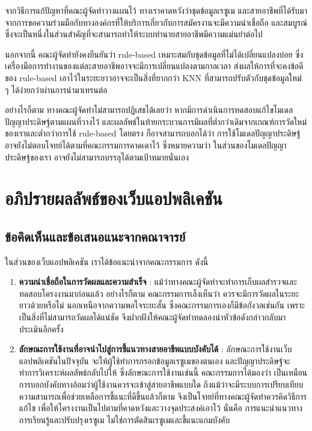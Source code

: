 \par{
    จากวิธีการแก้ปัญหาที่คณะผู้จัดทำวางแผนไว้ ทางเราคาดหวังว่าชุดข้อมูลเรซูเม และสายอาชีพที่ได้รับมาจากการขอความร่วมมือกับทางองค์กรที่ให้บริการเกี่ยวกับการสมัครงานจะมีความน่าเชื่อถือ และสมบูรณ์ ซึ่งจะเป็นหนึ่งในส่วนสำคัญที่จะสามารถทำให้ระบบทำนายสายอาชีพมีความแม่นยำต่อไป
}
\par{
    นอกจากนี้ คณะผู้จัดทำยังคงยืนยันว่า rule-based เหมาะสมกับชุดข้อมูลที่ไม่ได้เปลี่ยนแปลงบ่อย ซึ่งเครื่องมือการทำงานของแต่ละสายอาชีพอาจจะมีการเปลี่ยนแปลงตามกาลเวลา ส่งผลให้การที่จะคงข้อดีของ  rule-based เอาไว้ในระยะยาวอาจจะเป็นสิ่งที่ยากกว่า KNN ที่สามารถปรับตัวกับชุดข้อมูลใหม่ ๆ ได้ง่ายกว่าผ่านการนำมาเทรนต่อ

}
\par{
    อย่างไรก็ตาม ทางคณะผู้จัดทำไม่สามารถปฏิเสธได้เลยว่า หากมีการดำเนินการทดสอบแก้ไขโมเดลปัญญาประดิษฐ์ตามแผนที่วางไว้ และผลลัพธ์ในท้ายกระบวนการมีผลที่ต่ำกว่าเดิมจากเกณฑ์การวัดใหม่ของเราและต่ำกว่าการใช้ rule-based โดยตรง ก็อาจสามารถบอกได้ว่า การใช้โมเดลปัญญาประดิษฐ์อาจยังไม่ตอบโจทย์ได้ตามที่คณะกรรมการคาดเดาไว้ ซึ่งหมายความว่า ในส่วนของโมเดลปัญญาประดิษฐ์ของเรา อาจยังไม่สามารถบรรลุได้ตามเป้าหมายนั่นเอง
}







\section{อภิปรายผลลัพธ์ของเว็บแอปพลิเคชัน}
\subsection{ข้อคิดเห็นและข้อเสนอแนะจากคณาจารย์}
ในส่วนของเว็บแอปพลิเคชัน เราได้ข้อแนะนำจากคณะกรรมการ ดังนี้

\begin{enumerate}
    \item \textbf{ความน่าเชื่อถือในการวัดผลและความสำเร็จ} : แม้ว่าทางคณะผู้จัดทำจะทำการเก็บผลสำรวจและทดสอบโครงงานมาก่อนแล้ว อย่างไรก็ตาม คณะกรรมการเล็งเห็นว่า ควรจะมีการวัดผลในระยะยาวด้วยหรือไม่ นอกเหนือจากความพอใจระยะสั้น ซึ่งคณะกรรมการเองก็มีข้อกังวลเช่นกัน เพราะเป็นสิ่งที่ไม่สามารถวัดผลได้แน่ชัด จึงฝากฝังให้คณะผู้จัดทำทดลองนำหัวข้อดังกล่าวกลับมาประเมินอีกครั้ง
    \item \textbf{ลักษณะการใช้งานที่อาจนำไปสู่การชี้แนวทางสายอาชีพแบบบังคับได้} : ลักษณะการใช้งานเว็บแอปพลิเคชันในปัจจุบัน จะให้ผู้ใช้ทำการกรอกข้อมูลเรซูเมของตนเอง และปัญญาประดิษฐ์จะทำการวิเคราะห์ผลลัพธ์กลับไปให้ ซึ่งลักษณะการใช้งานเช่นนี้ คณะกรรมการได้มองว่า เป็นเหมือนการบอกบังคับทางอ้อมว่าผู้ใช้งานควรจะเข้าสู่สายอาชีพแบบใด ถึงแม้ว่าจะมีระบบการเปรียบเทียบความสามารถเพื่อช่วยเหลือการชี้แนะที่ดีขึ้นแล้วก็ตาม จึงเป็นโจทย์ที่ทางคณะผู้จัดทำควรคิดวิธีการแก้ไข เพื่อให้โครงงานเป็นไปตามที่คาดหวังและวางจุดประสงค์เอาไว้ นั่นคือ การแนะนำแนวทางการเรียนรู้และปรับปรุงเรซูเม ไม่ใช่การตัดสินเรซูเมและชี้แนะแกมบังคับ
\end{enumerate}

